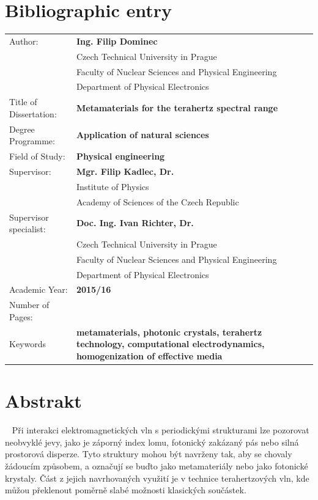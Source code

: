 \chapter*{Bibliographic entry}
\bgroup {}
\noindent\begin{tabular}{p{.25\linewidth}p{.7\linewidth}}
Author:					&\textbf{Ing. Filip Dominec} \\
					~	&Czech Technical University in Prague\\
					~	&Faculty of Nuclear Sciences and Physical Engineering\\ 
					~	&Department of Physical Electronics\\
Title of Dissertation:	&\textbf{Metamaterials for the terahertz spectral range} \\
Degree Programme:		&\textbf{Application of natural sciences} \\
Field of Study:			&\textbf{Physical engineering} \\
Supervisor:				&\textbf{Mgr. Filip Kadlec, Dr.} \\
					~	&Institute of Physics\\ 
					~	&Academy of Sciences of the Czech Republic\\  %
Supervisor specialist:	&\textbf{Doc. Ing. Ivan Richter, Dr.} \\
					~	&Czech Technical University in Prague\\ 
					~	&Faculty of Nuclear Sciences and Physical Engineering\\  
					~	&Department of Physical Electronics\\
Academic Year:			&\textbf{2015/16} \\
Number of Pages:		&\textbf{\pageref{enddocument}} \\
Keywords				&\textbf{metamaterials, photonic crystals, terahertz technology, computational electrodynamics, homogenization of effective media} \\
\end{tabular}
\egroup
\thispagestyle{empty} \newpage


\vspace{-20mm}
\chapter*{Abstrakt}
\noindent ~
Při interakci elektromagnetických vln s periodickými strukturami lze pozorovat neobvyklé jevy, jako je záporný index lomu, fotonický zakázaný pás nebo silná prostorová disperze. Tyto struktury mohou být navrženy tak, aby se chovaly žádoucím způsobem, a označují se buďto jako metamateriály nebo jako fotonické krystaly. Část z jejich navrhovaných využití je v technice terahertzových vln, kde můžou překlenout poměrně slabé možnosti klasických součástek.  

